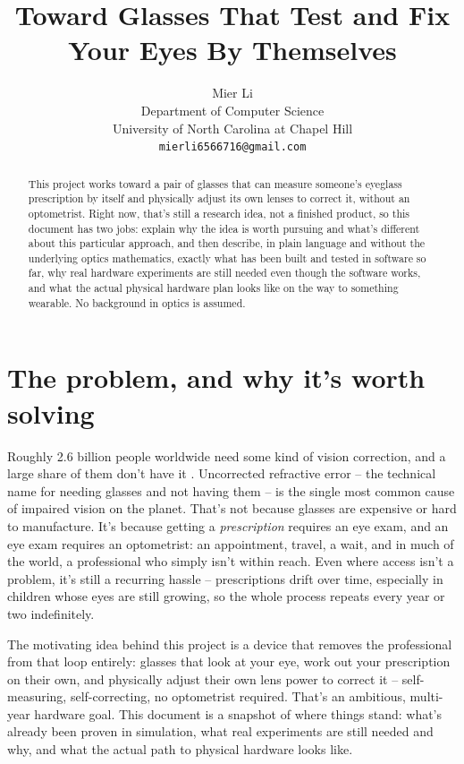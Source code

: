 \documentclass[11pt]{article}
\title{Toward Glasses That Test and Fix Your Eyes By Themselves}
\author{
  Mier Li \\
  Department of Computer Science \\
  University of North Carolina at Chapel Hill \\
  \texttt{mierli6566716@gmail.com}
}
\date{}
\begin{document}
\maketitle

\begin{abstract}
This project works toward a pair of glasses that can measure someone's eyeglass prescription by itself and physically adjust its own lenses to correct it, without an optometrist. Right now, that's still a research idea, not a finished product, so this document has two jobs: explain why the idea is worth pursuing and what's different about this particular approach, and then describe, in plain language and without the underlying optics mathematics, exactly what has been built and tested in software so far, why real hardware experiments are still needed even though the software works, and what the actual physical hardware plan looks like on the way to something wearable. No background in optics is assumed.
\end{abstract}

\section{The problem, and why it's worth solving}

Roughly 2.6 billion people worldwide need some kind of vision correction, and a large share of them don't have it \cite{who2019}. Uncorrected refractive error -- the technical name for needing glasses and not having them -- is the single most common cause of impaired vision on the planet. That's not because glasses are expensive or hard to manufacture. It's because getting a \emph{prescription} requires an eye exam, and an eye exam requires an optometrist: an appointment, travel, a wait, and in much of the world, a professional who simply isn't within reach. Even where access isn't a problem, it's still a recurring hassle -- prescriptions drift over time, especially in children whose eyes are still growing, so the whole process repeats every year or two indefinitely.

The motivating idea behind this project is a device that removes the professional from that loop entirely: glasses that look at your eye, work out your prescription on their own, and physically adjust their own lens power to correct it -- self-measuring, self-correcting, no optometrist required. That's an ambitious, multi-year hardware goal. This document is a snapshot of where things stand: what's already been proven in simulation, what real experiments are still needed and why, and what the actual path to physical hardware looks like.
\end{document}
